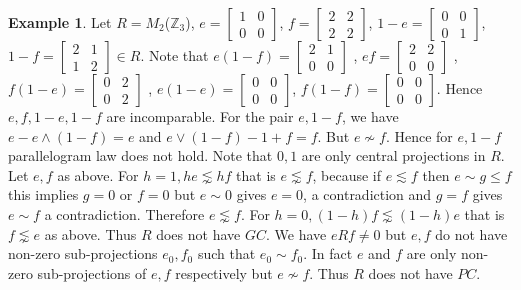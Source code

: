\documentclass[11pt, one side,emlines]{amsart}
\theoremstyle{definition}
\newtheorem{example}[lemma]{Example}
\numberwithin{equation}{section} \thispagestyle{empty} \voffset
\begin{document}
     \begin{example} Let $R=M_{2}$($\mathbb{Z}_{3}$), 
      $e=\begin{bmatrix}
     	1 & 0\\
     	0 & 0
     \end{bmatrix}$,  $f=\begin{bmatrix}
     	2 & 2\\
     	2 & 2
     \end{bmatrix}$, $1-e=\begin{bmatrix}
     	0 & 0\\
     	0 & 1
     \end{bmatrix}$, $1-f=\begin{bmatrix}
     	2 & 1\\
     	1 & 2
     \end{bmatrix} \in R$.
     Note that $e(1-f)=\begin{bmatrix}
     	2 & 1\\
     	0 & 0
     \end{bmatrix}$ , $ef=\begin{bmatrix}
     	2 & 2\\
     	0 & 0
     \end{bmatrix}$ , $f(1-e)=\begin{bmatrix}
     	0 & 2\\
     	0 & 2
     \end{bmatrix}$ , $e(1-e)=\begin{bmatrix}
     	0 & 0\\
     	0 & 0
     \end{bmatrix}$, $f(1-f)=\begin{bmatrix}
     	0 & 0\\
     	0 & 0
     \end{bmatrix}$. 
     Hence $e , f , 1-e , 1-f$ are incomparable.
      For the pair $e , 1-f$, we have $e-e\wedge(1-f)= e$ and $e\vee(1-f)-1+f= f$.
       But $e \nsim  f$. Hence for $e , 1-f$ parallelogram law does not hold. 
     Note that $0 , 1$ are only central projections in $R$. Let $e , f$ as above. For $h=1, he \lnsim hf$ that is $e \lnsim f$, because if $e \lesssim f $ then $e \sim g \le f$ this implies $g=0$ or $f=0$ but $e \sim 0$ gives $e=0$, a contradiction and $ g = f$ gives $e \sim f$  a contradiction. Therefore $e \lnsim f$.
      For $h = 0 , (1-h)f \lnsim (1-h)e$ that is $f\lnsim  e$ as above. Thus $R$ does not have $GC$.
       We have $eRf \neq 0$ but $e , f$ do not have non-zero sub-projections $e_{0} , f_{0}$ such that  $e_{0} \sim f_{0}$. In fact $e$ and $f$ are only non-zero sub-projections of $e , f$ respectively but $e \nsim f$. Thus $R$ does not have $PC$.
      \end{example}
           	
\end{document}
